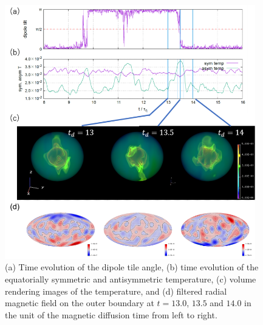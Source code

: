 \begin{figure}[ht]
\begin{center}
\includegraphics*[width=109mm]{Figures/temp_pvr_vrms_matsui_run_2.png}
\end{center}
\caption{
(a) Time evolution of the dipole tile angle, (b) time evolution of the equatorially symmetric and antisymmetric temperature, (c) volume rendering images of the temperature, and (d) filtered radial magnetic field on the outer boundary at $t = 13.0$, $13.5$ and $14.0$ in the unit of the magnetic diffusion time from left to right.
}
\label{fig:temperature_rendering}
\end{figure}